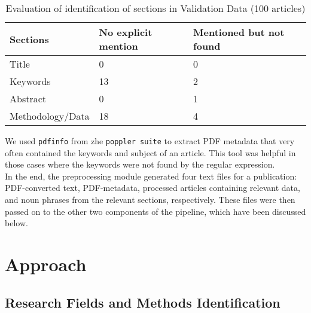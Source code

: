 \documentclass[runningheads]{llncs}
\begin{document}
	\begin{table}[!htb]
		\captionsetup{justification=centering,margin=1.2cm}
		\caption{Evaluation of identification of sections in Validation Data (100 articles)} \label{tab:sections}
		\begin{tabular}{C{4cm} C{3.5cm} C{4cm}} \hline
			\textbf{Sections} & \textbf{No explicit mention} & \textbf{Mentioned but not found}  \\ \hline
			Title & 0 & 0 \\ \hline
			Keywords & 13 & 2\\ \hline
			Abstract & 0 & 1\\ \hline
			Methodology/Data & 18 & 4 \\ \hline
		\end{tabular}
	\end{table}
	
	
	We used \texttt{pdfinfo} from zhe \texttt{poppler suite} to extract PDF metadata that very often contained the keywords and subject of an article. This tool was helpful in those cases where the keywords were not found by the regular expression. \\
	In the end, the preprocessing module generated four text files for a publication: PDF-converted text, PDF-metadata, processed articles containing relevant data, and noun phrases from the relevant sections, respectively. These files were then passed on to the other two components of the pipeline, which have been discussed below. %
	
	\section{Approach}
	
	
	\subsection{Research Fields and Methods Identification}
\end{document}
